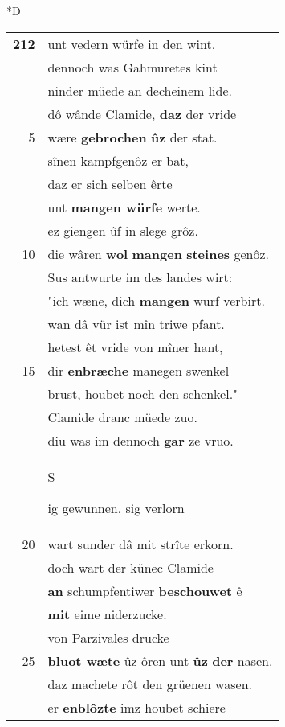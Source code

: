 \documentclass[8pt,a4paper,notitlepage]{article}
\begin{document}
\begin{table}[ht]
\begin{minipage}[t]{0.5\linewidth}
\small
\begin{center}*D
\end{center}
\begin{tabular}{rl}
\textbf{212} & unt vedern würfe in den wint.\\ 
 & dennoch was Gahmuretes kint\\ 
 & ninder müede an decheinem lide.\\ 
 & dô wânde Clamide, \textbf{daz} der vride\\ 
5 & wære \textbf{gebrochen} \textbf{ûz} der stat.\\ 
 & sînen kampfgenôz er bat,\\ 
 & daz er sich selben êrte\\ 
 & unt \textbf{mangen würfe} werte.\\ 
 & ez giengen ûf in slege grôz.\\ 
10 & die wâren \textbf{wol} \textbf{mangen} \textbf{steines} genôz.\\ 
 & Sus antwurte im des landes wirt:\\ 
 & "ich wæne, dich \textbf{mangen} wurf verbirt.\\ 
 & wan dâ vür ist mîn triwe pfant.\\ 
 & hetest êt vride von mîner hant,\\ 
15 & dir \textbf{enbræche} manegen swenkel\\ 
 & brust, houbet noch den schenkel."\\ 
 & Clamide dranc müede zuo.\\ 
 & diu was im dennoch \textbf{gar} ze vruo.\\ 
 & \begin{large}S\end{large}ig gewunnen, sig verlorn\\ 
20 & wart sunder dâ mit strîte erkorn.\\ 
 & doch wart der künec Clamide\\ 
 & \textbf{an} schumpfentiwer \textbf{beschouwet} ê\\ 
 & \textbf{mit} eime niderzucke.\\ 
 & von Parzivales drucke\\ 
25 & \textbf{bluot wæte} ûz ôren unt \textbf{ûz} \textbf{der} nasen.\\ 
 & daz machete rôt den grüenen wasen.\\ 
 & er \textbf{enblôzte} imz houbet schiere\\ 

\end{tabular}
\end{minipage}
\end{table}
\end{document}
